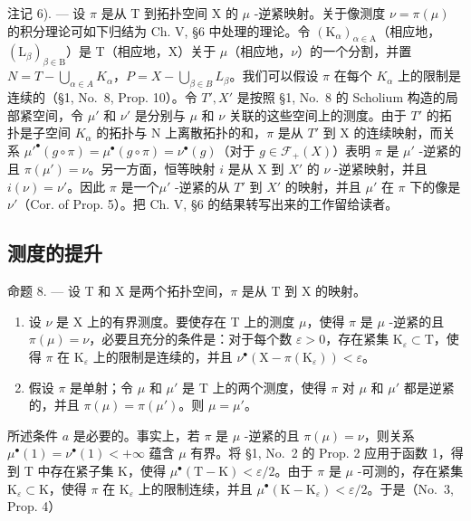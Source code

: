 注记 6). --- 设 \(\pi\) 是从 T 到拓扑空间 X 的 \(\mu\) -逆紧映射。关于像测度 \(\nu = \pi(\mu)\) 的积分理论可如下归结为 Ch. V, §6 中处理的理论。令 \((\mathrm{K}_{\alpha})_{\alpha \in \mathrm{A}}\)（相应地，\((\mathrm{L}_{\beta})_{\beta \in \mathrm{B}}\)）是 T（相应地，X）关于 \(\mu\)（相应地，\(\nu\)）的一个分割，并置 \(N = T - \bigcup_{\alpha \in A} K_{\alpha}\)，\(P = X - \bigcup_{\beta \in B} L_{\beta}\)。我们可以假设 \(\pi\) 在每个 \(K_{\alpha}\) 上的限制是连续的（§1, No.~8, Prop. 10）。令 \(T', X'\) 是按照 §1, No.~8 的 Scholium 构造的局部紧空间，令 \(\mu'\) 和 \(\nu'\) 是分别与 \(\mu\) 和 \(\nu\) 关联的这些空间上的测度。由于 \(T'\) 的拓扑是子空间 \(K_{\alpha}\) 的拓扑与 N 上离散拓扑的和，\(\pi\) 是从 \(T'\) 到 X 的连续映射，而关系 \(\mu'^{\bullet}(g \circ \pi) = \mu^{\bullet}(g \circ \pi) = \nu^{\bullet}(g)\)（对于 \(g \in \mathcal{F}_{+}(X)\)）表明 \(\pi\) 是 \(\mu'\) -逆紧的且 \(\pi(\mu') = \nu\)。另一方面，恒等映射 \(i\) 是从 X 到 \(X'\) 的 \(\nu\) -逆紧映射，并且 \(i(\nu) = \nu'\)。因此 \(\pi\) 是一个\(\mu'\) -逆紧的从 \(T'\) 到 \(X'\) 的映射，并且 \(\mu'\) 在 \(\pi\) 下的像是 \(\nu'\)（Cor. of Prop. 5）。把 Ch. V, §6 的结果转写出来的工作留给读者。

\subsection{测度的提升}

命题 8. --- 设 T 和 X 是两个拓扑空间，\(\pi\) 是从 T 到 X 的映射。

\begin{enumerate}
\def\labelenumi{\alph{enumi})}
\item
  设 \(\nu\) 是 X 上的有界测度。要使存在 T 上的测度 \(\mu\)，使得 \(\pi\) 是 \(\mu\) -逆紧的且 \(\pi(\mu) = \nu\)，必要且充分的条件是：对于每个数 \(\varepsilon > 0\)，存在紧集 \(\mathrm{K}_{\varepsilon} \subset \mathrm{T}\)，使得 \(\pi\) 在 \(\mathrm{K}_{\varepsilon}\) 上的限制是连续的，并且 \(\nu^{\bullet}(\mathrm{X} - \pi(\mathrm{K}_{\varepsilon})) < \varepsilon\)。
\item
  假设 \(\pi\) 是单射；令 \(\mu\) 和 \(\mu'\) 是 T 上的两个测度，使得 \(\pi\) 对 \(\mu\) 和 \(\mu'\) 都是逆紧的，并且 \(\pi(\mu) = \pi(\mu')\)。则 \(\mu = \mu'\)。
\end{enumerate}

所述条件 \(a\) 是必要的。事实上，若 \(\pi\) 是 \(\mu\) -逆紧的且 \(\pi(\mu) = \nu\)，则关系 \(\mu^{\bullet}(1) = \nu^{\bullet}(1) < +\infty\) 蕴含 \(\mu\) 有界。将 §1, No.~2 的 Prop. 2 应用于函数 1，得到 T 中存在紧子集 K，使得 \(\mu^{\bullet}(\mathrm{T} - \mathrm{K}) < \varepsilon/2\)。由于 \(\pi\) 是 \(\mu\) -可测的，存在紧集 \(\mathrm{K}_{\varepsilon} \subset \mathrm{K}\)，使得 \(\pi\) 在 \(\mathrm{K}_{\varepsilon}\) 上的限制连续，并且 \(\mu^{\bullet}(\mathrm{K} - \mathrm{K}_{\varepsilon}) < \varepsilon/2\)。于是（No.~3, Prop. 4）

